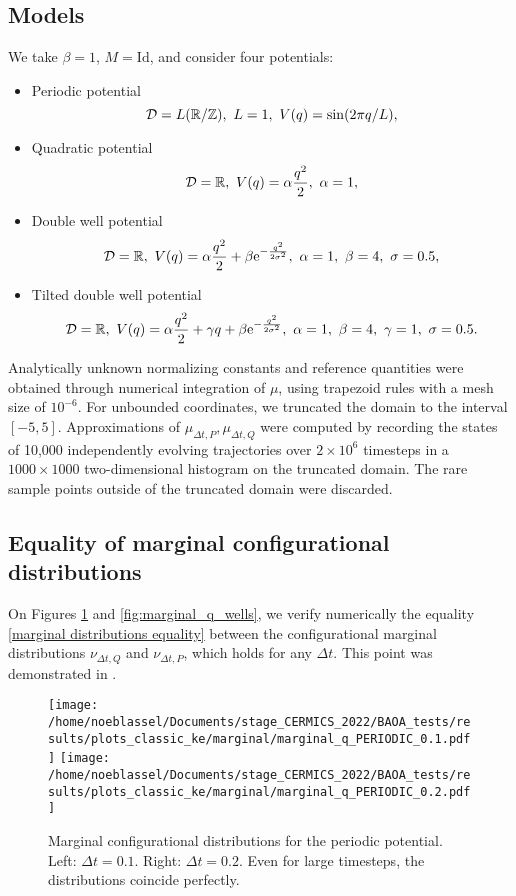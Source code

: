 \subsection{Models}\label{models}
 We take $\beta=1$, $M=\mathrm{Id}$, and consider four potentials:
\begin{itemize}
  \item Periodic potential $$ \mathcal D = L(\mathbb{R}/\mathbb Z),\ L=1,\ V(q)=\sin(2\pi q/L), $$
  \item Quadratic potential $$ \mathcal D = \mathbb{R},\ V(q)=\alpha \frac{q^2}2,\ \alpha=1,$$
  \item Double well potential $$ \mathcal D = \R,\ V(q)=\alpha \frac{q^2}2 +\beta\mathrm{e}^{-\frac{q^2}{2\sigma^2}},\ \alpha=1,\ \beta=4,\ \sigma=0.5,$$
  \item Tilted double well potential $$ \mathcal D = \R,\ V(q)=\alpha \frac{q^2}2 + \gamma q+\beta\mathrm{e}^{-\frac{q^2}{2\sigma^2}},\ \alpha=1,\ \beta=4,\ \gamma=1,\ \sigma=0.5.$$
\end{itemize}
Analytically unknown normalizing constants and reference quantities were obtained through numerical integration of $\mu$, using trapezoid rules with a mesh size of $10^{-6}$. For unbounded coordinates, we truncated the domain to the interval $[-5,5]$.
Approximations of $\mu_{\Delta t,P},\mu_{\Delta t,Q}$ were computed by recording the states of 10,000 independently evolving trajectories over $2\times 10^6$ timesteps in a $1000\times1000$ two-dimensional histogram on the truncated domain. The rare sample points outside of the truncated domain were discarded.

\subsection{Equality of marginal configurational distributions}\label{nuP equals nuQ}
On Figures  \ref{fig:marginal_q_periodic} and \ref{fig:marginal_q_wells}, we verify numerically the equality \eqref{marginal distributions equality} between the configurational marginal distributions $\nu_{\Delta t,Q}$ and $\nu_{\Delta t,P}$, which holds for any $\Delta t$. This point was demonstrated in \cite{KK22}.
\begin{figure}[htbp]
  \begin{center}
    \texttt{[image: /home/noeblassel/Documents/stage\_CERMICS\_2022/BAOA\_tests/results/plots\_classic\_ke/marginal/marginal\_q\_PERIODIC\_0.1.pdf]}
    \texttt{[image: /home/noeblassel/Documents/stage\_CERMICS\_2022/BAOA\_tests/results/plots\_classic\_ke/marginal/marginal\_q\_PERIODIC\_0.2.pdf]}
    
    \caption{ \label{fig:marginal_q_periodic}
      Marginal configurational distributions for the periodic potential. Left: $\Delta t=0.1$. Right: $\Delta t=0.2$. Even for large timesteps, the distributions coincide perfectly.
    }
  \end{center}
\end{figure}

